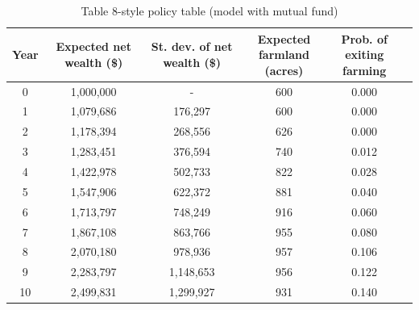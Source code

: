 \begin{table}
\caption{Table 8-style policy table (model with mutual fund)}
\label{tab:table8_mutual_makecell}
\begin{tabular}{cccccc}
\toprule
Year & \makecell{Expected net\\wealth (\$)} & \makecell{St. dev. of\\net wealth (\$)} & \makecell{Expected farmland\\(acres)} & \makecell{Prob. of exiting\\farming} \\
\midrule
0 & 1,000,000 & - & 600 & 0.000 \\
1 & 1,079,686 & 176,297 & 600 & 0.000 \\
2 & 1,178,394 & 268,556 & 626 & 0.000 \\
3 & 1,283,451 & 376,594 & 740 & 0.012 \\
4 & 1,422,978 & 502,733 & 822 & 0.028 \\
5 & 1,547,906 & 622,372 & 881 & 0.040 \\
6 & 1,713,797 & 748,249 & 916 & 0.060 \\
7 & 1,867,108 & 863,766 & 955 & 0.080 \\
8 & 2,070,180 & 978,936 & 957 & 0.106 \\
9 & 2,283,797 & 1,148,653 & 956 & 0.122 \\
10 & 2,499,831 & 1,299,927 & 931 & 0.140 \\
\bottomrule
\end{tabular}
\end{table}
